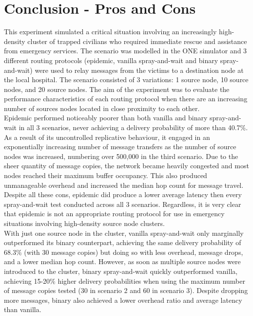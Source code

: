 \documentclass{article}
\begin{document}
\restoregeometry

\clearpage

\section{Conclusion - Pros and Cons}
This experiment simulated a critical situation involving an increasingly high-density cluster of trapped civilians who required immediate rescue and assistance from emergency services. The scenario was modelled in the ONE simulator and 3 different routing protocols (epidemic, vanilla spray-and-wait and binary spray-and-wait) were used to relay messages from the victims to a destination node at the local hospital. The scenario consisted of 3 variations: 1 source node, 10 source nodes, and 20 source nodes. The aim of the experiment was to evaluate the performance characteristics of each routing protocol when there are an increasing number of sources nodes located in close proximity to each other.\\
\newline Epidemic performed noticeably poorer than both vanilla and binary spray-and-wait in all 3 scenarios, never achieving a delivery probability of more than 40.7\%. As a result of its uncontrolled replicative behaviour, it engaged in an exponentially increasing number of message transfers as the number of source nodes was increased, numbering over 500,000 in the third scenario. Due to the sheer quantity of message copies, the network became heavily congested and most nodes reached their maximum buffer occupancy. This also produced unmanageable overhead and increased the median hop count for message travel. Despite all these cons, epidemic did produce a lower average latency then every spray-and-wait test conducted across all 3 scenarios. Regardless, it is very clear that epidemic is not an appropriate routing protocol for use in emergency situations involving high-density source node clusters.\\
\newline With just one source node in the cluster, vanilla spray-and-wait only marginally outperformed its binary counterpart, achieving the same delivery probability of 68.3\% (with 30 message copies) but doing so with less overhead, message drops, and a lower median hop count. However, as soon as multiple source nodes were introduced to the cluster, binary spray-and-wait quickly outperformed vanilla, achieving 15-20\% higher delivery probabilities when using the maximum number of message copies tested (30 in scenario 2 and 60 in scenario 3). Despite dropping more messages, binary also achieved a lower overhead ratio and average latency than vanilla.\\
\end{document}
